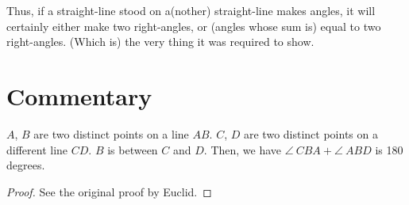 Thus, if a straight-line stood on a(nother)  straight-line makes angles,
it will certainly either make two right-angles, or (angles whose sum is) equal
to two right-angles. (Which is) the very thing it was required to show.



\section*{Commentary}

\begin{proposition}\label{proposition_13}\leanok
    $A$, $B$ are two distinct points on a line $AB$. $C$, $D$ are two distinct points on a different line $CD$. $B$ is between $C$ and $D$. Then, we have $\angle~CBA + \angle~ABD$ is 180 degrees.
\end{proposition}
\begin{proof}
    \leanok
    See the original proof by Euclid.
\end{proof}
